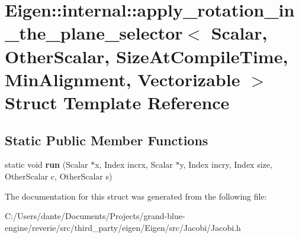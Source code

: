 \hypertarget{struct_eigen_1_1internal_1_1apply__rotation__in__the__plane__selector}{}\section{Eigen\+::internal\+::apply\+\_\+rotation\+\_\+in\+\_\+the\+\_\+plane\+\_\+selector$<$ Scalar, Other\+Scalar, Size\+At\+Compile\+Time, Min\+Alignment, Vectorizable $>$ Struct Template Reference}
\label{struct_eigen_1_1internal_1_1apply__rotation__in__the__plane__selector}
\subsection*{Static Public Member Functions}
\begin{DoxyCompactItemize}
\item 
\mbox{\label{struct_eigen_1_1internal_1_1apply__rotation__in__the__plane__selector_aff8f3fcd71eba976715a825b98d2a79c}} 
static void {\bfseries run} (Scalar $\ast$x, Index incrx, Scalar $\ast$y, Index incry, Index size, Other\+Scalar c, Other\+Scalar s)
\end{DoxyCompactItemize}


The documentation for this struct was generated from the following file\+:\begin{DoxyCompactItemize}
\item 
C\+:/\+Users/dante/\+Documents/\+Projects/grand-\/blue-\/engine/reverie/src/third\+\_\+party/eigen/\+Eigen/src/\+Jacobi/Jacobi.\+h\end{DoxyCompactItemize}

